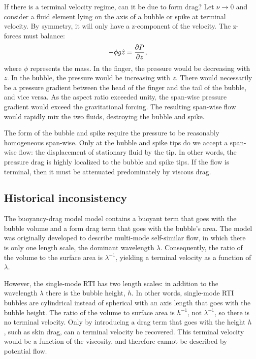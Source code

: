 If there is a terminal velocity regime, can it be due to form drag?
Let $\nu \rightarrow 0$ and consider a fluid element lying on the axis
of a bubble or spike at terminal velocity.
By symmetry, it will only have a z-component of the velocity.
The z-forces must balance:
\begin{equation}
- \phi g \hat{z} = \frac{\partial P}{\partial z} ,
\end{equation}
where $\phi$ represents the mass.
In the finger, the pressure would be decreasing with $z$.
In the bubble, the pressure would be increasing with $z$.
There would necessarily be a pressure gradient between the head of the finger and the tail of the bubble, and vice versa.
As the aspect ratio exceeded unity, the span-wise pressure gradient would exceed the gravitational forcing.
The resulting span-wise flow would rapidly mix the two fluids, destroying the bubble and spike.

The form of the bubble and spike require the pressure to be reasonably homogeneous span-wise.
Only at the bubble and spike tips do we accept a span-wise flow: the displacement of stationary fluid by the tip.
In other words, the pressure drag is highly localized to the bubble and spike tips.
If the flow is terminal, then it must be attenuated predominately by viscous drag.

\subsection{Historical inconsistency}

The buoyancy-drag model model contains a buoyant term that goes with the bubble volume and a form drag term that goes with the bubble's area.
The model was originally developed to describe multi-mode self-similar flow, in which there is only one length scale, the dominant wavelength $\lambda$.
Consequently, the ratio of the volume to the surface area is $\lambda^{-1}$, yielding a terminal velocity as a function of $\lambda$.

However, the single-mode RTI has two length scales: in addition to the wavelength $\lambda$ there is the bubble height, $h$.
In other words, single-mode RTI bubbles are cylindrical instead of spherical with an axis length that goes with the bubble height.
The ratio of the volume to surface area is $h^{-1}$, not $\lambda^{-1}$, so there is no terminal velocity.
Only by introducing a drag term that goes with the height $h$, such as skin drag, can a terminal velocity be recovered.
This terminal velocity would be a function of the viscosity, and therefore cannot be described by potential flow.

